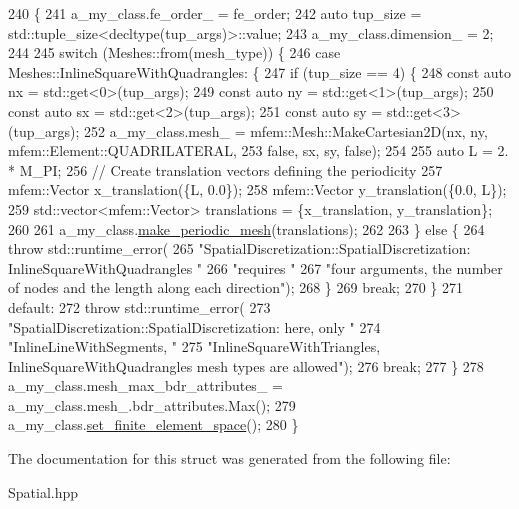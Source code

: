\begin{DoxyCode}
240                                                                    \{
241     a\_my\_class.fe\_order\_ = fe\_order;
242     \textcolor{keyword}{auto} tup\_size = std::tuple\_size<decltype(tup\_args)>::value;
243     a\_my\_class.dimension\_ = 2;
244 
245     \textcolor{keywordflow}{switch} (Meshes::from(mesh\_type)) \{
246       \textcolor{keywordflow}{case} Meshes::InlineSquareWithQuadrangles: \{
247         \textcolor{keywordflow}{if} (tup\_size == 4) \{
248           \textcolor{keyword}{const} \textcolor{keyword}{auto} nx = std::get<0>(tup\_args);
249           \textcolor{keyword}{const} \textcolor{keyword}{auto} ny = std::get<1>(tup\_args);
250           \textcolor{keyword}{const} \textcolor{keyword}{auto} sx = std::get<2>(tup\_args);
251           \textcolor{keyword}{const} \textcolor{keyword}{auto} sy = std::get<3>(tup\_args);
252           a\_my\_class.mesh\_ = mfem::Mesh::MakeCartesian2D(nx, ny, mfem::Element::QUADRILATERAL,
253                                                          \textcolor{keyword}{false}, sx, sy, \textcolor{keyword}{false});
254 
255           \textcolor{keyword}{auto} L = 2. * M\_PI;
256           \textcolor{comment}{// Create translation vectors defining the periodicity}
257           mfem::Vector x\_translation(\{L, 0.0\});
258           mfem::Vector y\_translation(\{0.0, L\});
259           std::vector<mfem::Vector> translations = \{x\_translation, y\_translation\};
260 
261           a\_my\_class.\hyperlink{classSpatialDiscretization_a4b88c0c7dbdb10a8d1442e599ac9a831}{make\_periodic\_mesh}(translations);
262 
263         \} \textcolor{keywordflow}{else} \{
264           \textcolor{keywordflow}{throw} std::runtime\_error(
265               \textcolor{stringliteral}{"SpatialDiscretization::SpatialDiscretization: InlineSquareWithQuadrangles "}
266               \textcolor{stringliteral}{"requires "}
267               \textcolor{stringliteral}{"four arguments, the number of nodes and the length along each direction"});
268         \}
269         \textcolor{keywordflow}{break};
270       \}
271       \textcolor{keywordflow}{default}:
272         \textcolor{keywordflow}{throw} std::runtime\_error(
273             \textcolor{stringliteral}{"SpatialDiscretization::SpatialDiscretization: here, only "}
274             \textcolor{stringliteral}{"InlineLineWithSegments, "}
275             \textcolor{stringliteral}{"InlineSquareWithTriangles, InlineSquareWithQuadrangles mesh types are allowed"});
276         \textcolor{keywordflow}{break};
277     \}
278     a\_my\_class.mesh\_max\_bdr\_attributes\_ = a\_my\_class.mesh\_.bdr\_attributes.Max();
279     a\_my\_class.\hyperlink{classSpatialDiscretization_a8400a265a094312b4d57708d44f9d627}{set\_finite\_element\_space}();
280   \}
\end{DoxyCode}


The documentation for this struct was generated from the following file\+:\begin{DoxyCompactItemize}
\item 
Spatial.\+hpp\end{DoxyCompactItemize}
